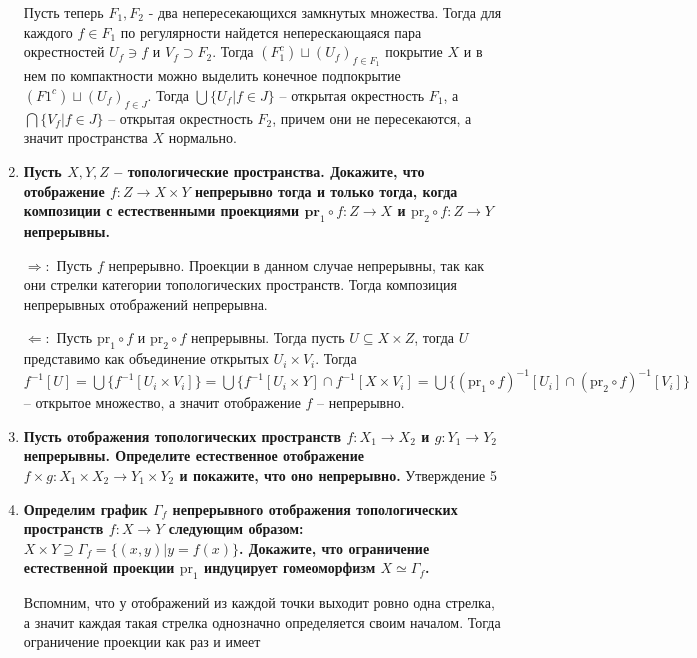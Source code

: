 \documentclass{article}
\begin{document}
\begin{enumerate}
        Пусть теперь $F_1, F_2$ - два непересекающихся замкнутых множества.
        Тогда для каждого $f\in F_1$ по регулярности найдется неперескающаяся
        пара окрестностей $U_f\ni f$ и $V_f\supset F_2$. Тогда $(F_1^c)\sqcup
        (U_f)_{f\in F_1}$ покрытие $X$ и в нем по компактности можно выделить
        конечное подпокрытие $(F1^c)\sqcup (U_f)_{f\in J}$. Тогда $\bigcup\{U_f|
        f\in J\}$ – открытая окрестность $F_1$, а $\bigcap\{V_f|f\in J\}$ –
        открытая окрестность $F_2$, причем они не пересекаются, а значит
        пространства $X$ нормально.
    \item \textbf{Пусть $X,Y,Z$ – топологические пространства. Докажите, что
        отображение $f:Z\longrightarrow X\times Y$ непрерывно тогда и только
        тогда, когда композиции с естественными проекциями $\textbf{pr}_1\circ
        f:Z\longrightarrow X$ и $\text{pr}_2\circ f:Z\longrightarrow Y$
        непрерывны.}\par
        $\Rightarrow:$ Пусть $f$ непрерывно. Проекции в данном случае
        непрерывны, так как они стрелки категории топологических пространств.
        Тогда композиция непрерывных отображений непрерывна.\par
        $\Leftarrow:$ Пусть $\text{pr}_1\circ f$ и $\text{pr}_2\circ f$
        непрерывны. Тогда пусть $U\subseteq X\times Z$, тогда $U$ представимо
        как объединение открытых $U_i\times V_i$. Тогда $f^{-1}[U] = \bigcup\{
        f^{-1}[U_i\times V_i]\}=\bigcup\{f^{-1}[U_i\times Y]\cap f^{-1}[X\times
        V_i]=\bigcup\{(\text{pr}_1\circ f)^{-1}[U_i]\cap(\text{pr}_2\circ f)^
        {-1}[V_i]\}$ – открытое множество, а значит отображение $f$ –
        непрерывно.
    \item \textbf{Пусть отображения топологических пространств $f:X_1
        \longrightarrow X_2$ и $g:Y_1\longrightarrow Y_2$ непрерывны.
        Определите естественное отображение $f\times g:X_1\times X_2
        \longrightarrow Y_1\times Y_2$ и покажите, что оно непрерывно.}
        Утверждение 5
    \item \textbf{Определим график $\Gamma_f$ непрерывного отображения
        топологических пространств $f:X\longrightarrow Y$ следующим образом:
        $X\times Y\supseteq \Gamma_f=\{(x,y)|y=f(x)\}$. Докажите, что
        ограничение естественной проекции $\text{pr}_1$ индуцирует гомеоморфизм
        $X\simeq\Gamma_f$.}\par Вспомним, что у отображений из каждой точки
        выходит ровно одна стрелка, а значит каждая такая стрелка однозначно
        определяется своим началом. Тогда ограничение проекции как раз и имеет

\end{enumerate}
\end{document}

